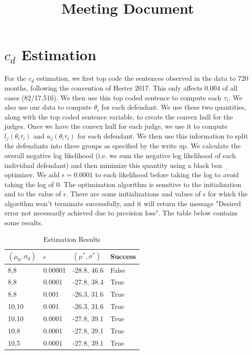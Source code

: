 \documentclass[11pt]{article}
\title{Meeting Document}
\begin{document}
\maketitle

\section{$c_d$ Estimation}
  For the $c_d$ estimation, we first top code the sentences observed in the data to 720 months, following the convention of Hester 2017. This only affects $0.004$ of all cases (82/17,516). We then use this top coded sentence to compute each $\tau_i$. We also use our data to compute $\theta_i$ for each defendant. We use these two quantities, along with the top coded sentence variable, to create the convex hull for the judges. Once we have the convex hull for each judge, we use it to compute $l_j(\theta_i \tau_i)$ and $u_j(\theta_i \tau_i)$ for each defendant. We then use this information to split the defendants into three groups as specified by the write up. We calculate the overall negative log likelihood (i.e. we sum the negative log likelihood of each individual defendant) and then minimize this quantity using a black box optimizer. We add $\epsilon=0.0001$ to each likelihood before taking the log to avoid taking the log of 0. The optimization algorithm is sensitive to the initialization and to the value of $\epsilon$. There are some initializations and values of $\epsilon$ for which the algorithm won't terminate successfully, and it will return the message "Desired error not necessarily achieved due to precision loss". The table below contains some results.

  \begin{table}[H]
  \centering
  \caption{Estimation Results}
  \label{tab:my-table}
  \begin{tabular}{|l|l|l|l|}
  \hline
  \textbf{$(\mu_0,\sigma_0)$} & \textbf{$\epsilon$} & \textbf{$(\mu^*,\sigma^*)$} & \textbf{Success} \\ \hline
  8,8   & 0.00001 & -28.8, 46.6 & False \\ \hline
  8,8   & 0.0001  & -27.8, 38.4 & True  \\ \hline
  8,8   & 0.001   & -26.3, 31.6 & True  \\ \hline
  10,10 & 0.001   & -26.3, 31.6 & True  \\ \hline
  10,10 & 0.0001  & -27.8, 39.1 & True  \\ \hline
  10,8  & 0.0001  & -27.8, 39.1 & True  \\ \hline
  10,5  & 0.0001  & -27.8, 39.1 & True  \\ \hline
  \end{tabular}
  \end{table}
\end{document}
